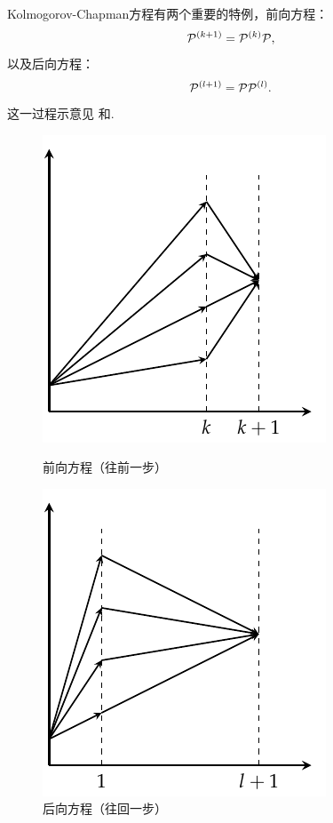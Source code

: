 Kolmogorov-Chapman方程有两个重要的特例，前向方程：
\[\mathcal P^{(k+1)}=\mathcal P^{(k)}\mathcal P,\]
以及后向方程：
\[\mathcal P^{(l+1)}=\mathcal P\mathcal P^{(l)}.\]
这一过程示意见 和.
\begin{figure}[ht]
    \begin{minipage}[t]{0.45\linewidth}
        \centering
        \includegraphics[width=0.8\linewidth]{figures/Markov-chain/forward-equation.pdf}
        \caption{前向方程（往前一步）}
        \label{fig:forward-equation}
    \end{minipage}
    \hfill
    \begin{minipage}[t]{0.45\linewidth}
        \centering
        \includegraphics[width=0.8\linewidth]{figures/Markov-chain/backward-equation.pdf}
        \caption{后向方程（往回一步）}
        \label{fig:backward-equation}
    \end{minipage}
\end{figure}

